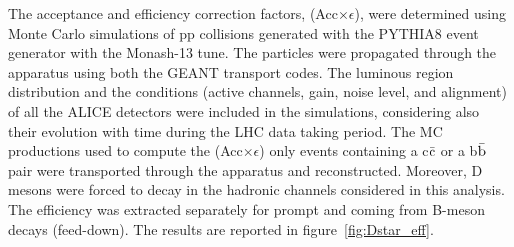 The acceptance and efficiency correction factors, (Acc$\times \epsilon$), were determined using Monte Carlo simulations of pp collisions generated with the PYTHIA8 event generator with the Monash-13 tune. The particles were propagated through the apparatus using both the GEANT transport codes. The luminous region distribution and the conditions (active channels, gain, noise level, and alignment) of all the ALICE detectors were included in the simulations, considering also their evolution with time during the LHC data taking period. The MC productions used to compute the (Acc$\times \epsilon$) only events containing a c$\bar{\rm c}$ or a b$\bar{\rm b}$ pair were transported through the apparatus and reconstructed. Moreover, D mesons were forced to decay in the hadronic channels considered in this analysis. The efficiency was extracted separately for prompt \Dstar and \Dstar
coming from B-meson decays (feed-down). The results are reported in figure~\ref{fig:Dstar_eff}.






